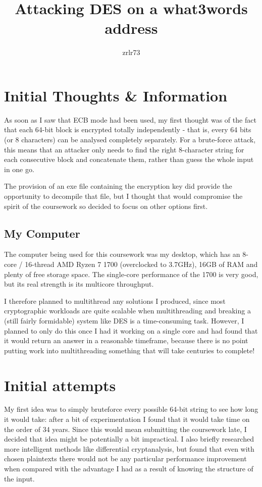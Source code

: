 \documentclass[11pt]{article} %
\title{\vspace{-1.6cm}Attacking DES on a what3words address}
\author{zrlr73}
\date{} %
\begin{document}
\maketitle



\section{Initial Thoughts \& Information}

As soon as I saw that ECB mode had been used, my first thought was of the fact that each 64-bit block is encrypted totally independently - that is, every 64 bits (or 8 characters) can be analysed completely separately. For a brute-force attack, this means that an attacker only needs to find the right 8-character string for each consecutive block and concatenate them, rather than guess the whole input in one go.

The provision of an exe file containing the encryption key did provide the opportunity to decompile that file, but I thought that would compromise the spirit of the coursework so decided to focus on other options first.

\subsection{My Computer}

The computer being used for this coursework was my desktop, which has an 8-core / 16-thread AMD Ryzen 7 1700 (overclocked to 3.7GHz), 16GB of RAM and plenty of free storage space. The single-core performance of the 1700 is very good, but its real strength is its multicore throughput.

I therefore planned to multithread any solutions I produced, since most cryptographic workloads are quite scalable when multithreading and breaking a (still fairly formidable) system like DES is a time-consuming task. However, I planned to only do this once I had it working on a single core and had found that it would return an answer in a reasonable timeframe, because there is no point putting work into multithreading something that will take centuries to complete!

\section{Initial attempts}

My first idea was to simply bruteforce every possible 64-bit string to see how long it would take: after a bit of experimentation I found that it would take time on the order of 34 years. Since this would mean submitting the coursework late, I decided that idea might be potentially a bit impractical. I also briefly researched more intelligent methods like differential cryptanalysis, but found that even with chosen plaintexts there would not be any particular performance improvement when compared with the advantage I had as a result of knowing the structure of the input.
\end{document}
